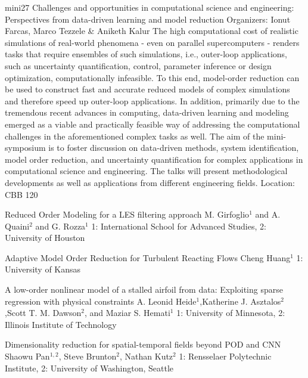 \mini
{mini27}
{Challenges and opportunities in computational science and engineering: Perspectives from data-driven learning and model reduction}
{Organizers: Ionut Farcas, Marco Tezzele \& Aniketh Kalur}
{The high computational cost of realistic simulations of real-world phenomena - even on parallel supercomputers - renders tasks that require ensembles of such simulations, i.e., outer-loop applications, such as uncertainty quantification, control, parameter inference or design optimization, computationally infeasible. To this end, model-order reduction can be used to construct fast and accurate reduced models of complex simulations and therefore speed up outer-loop applications. In addition, primarily due to the tremendous recent advances in computing, data-driven learning and modeling emerged as a viable and practically feasible way of addressing the computational challenges in the aforementioned complex tasks as well. The aim of the mini-symposium is to foster discussion on data-driven methods, system identification, model order reduction, and uncertainty quantification for complex applications in computational science and engineering. The talks will present methodological developments as well as applications from different engineering fields.}
{Location: CBB 120}

\begin{talks}
\item\talk
{Reduced Order Modeling for a LES filtering approach}
{M. Girfoglio$^{1}$ and A. Quaini$^{2}$ and G. Rozza$^{1}$}
{1: International School for Advanced Studies, 2: University of Houston}
\item\talk
{Adaptive Model Order Reduction for Turbulent Reacting Flows}
{Cheng Huang$^{1}$}
{1: University of Kansas}
\item\talk
{A low-order nonlinear model of a stalled airfoil from data: Exploiting sparse regression with physical constraints}
{A. Leonid Heide$^{1}$,Katherine J. Asztalos$^{2}$,Scott T. M. Dawson$^{2}$, and Maziar S. Hemati$^{1}$}
{1: University of Minnesota, 2: Illinois Institute of Technology}
\item\talk
{Dimensionality reduction for spatial-temporal fields beyond POD and CNN}
{Shaowu Pan$^{1,2}$, Steve Brunton$^{2}$, Nathan Kutz$^{2}$}
{1: Rensselaer Polytechnic Institute, 2: University of Washington, Seattle}
\end{talks}
\room
